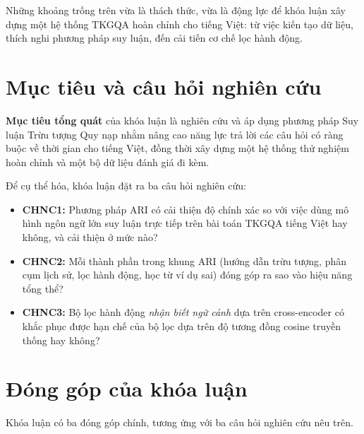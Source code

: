 Những khoảng trống trên vừa là thách thức, vừa là động lực để khóa luận xây dựng một hệ thống
TKGQA hoàn chỉnh cho tiếng Việt: từ việc kiến tạo dữ liệu, thích nghi phương pháp suy luận, đến
cải tiến cơ chế lọc hành động.

\section{Mục tiêu và câu hỏi nghiên cứu}
\label{sec:objectives}

\textbf{Mục tiêu tổng quát} của khóa luận là nghiên cứu và áp dụng phương pháp Suy luận Trừu
tượng Quy nạp nhằm nâng cao năng lực trả lời các câu hỏi có ràng buộc về thời gian cho tiếng Việt,
đồng thời xây dựng một hệ thống thử nghiệm hoàn chỉnh và một bộ dữ liệu đánh giá đi kèm.

Để cụ thể hóa, khóa luận đặt ra ba câu hỏi nghiên cứu:

\begin{itemize}
  \item \textbf{CHNC1:} Phương pháp ARI có cải thiện độ chính xác so với việc dùng mô hình ngôn
  ngữ lớn suy luận trực tiếp trên bài toán TKGQA tiếng Việt hay không, và cải thiện ở mức nào?
  \item \textbf{CHNC2:} Mỗi thành phần trong khung ARI (hướng dẫn trừu tượng, phân cụm lịch sử,
  lọc hành động, học từ ví dụ sai) đóng góp ra sao vào hiệu năng tổng thể?
  \item \textbf{CHNC3:} Bộ lọc hành động \emph{nhận biết ngữ cảnh} dựa trên cross-encoder có khắc
  phục được hạn chế của bộ lọc dựa trên độ tương đồng cosine truyền thống hay không?
\end{itemize}

\section{Đóng góp của khóa luận}
\label{sec:contributions}

Khóa luận có ba đóng góp chính, tương ứng với ba câu hỏi nghiên cứu nêu trên.

